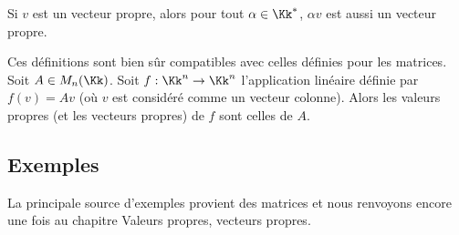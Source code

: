 \documentclass[12pt, class=report,crop=false]{standalone}
\begin{document}
Si $v$ est un vecteur propre, alors pour tout $\alpha \in \Kk^*$, $\alpha v$ est aussi un vecteur propre.
 

 
Ces définitions sont bien sûr compatibles avec celles définies pour les matrices.
Soit $A \in M_n(\Kk)$. Soit $f : \Kk^n \to \Kk^n$ l'application linéaire définie par  
$f(v) = Av$ (où $v$ est considéré comme un vecteur colonne). Alors les valeurs propres (et les vecteurs propres) de $f$ sont celles de $A$.
 
 

\subsection{Exemples}


La principale source d'exemples provient des matrices et nous renvoyons encore une fois au chapitre \og{}Valeurs propres, vecteurs propres\fg{}.
\end{document}
